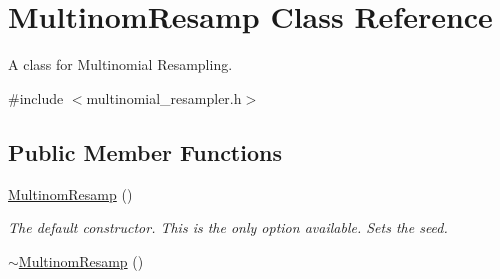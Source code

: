 \hypertarget{classMultinomResamp}{}\section{Multinom\+Resamp Class Reference}
\label{classMultinomResamp}


A class for Multinomial Resampling.  




{\ttfamily \#include $<$multinomial\+\_\+resampler.\+h$>$}

\subsection*{Public Member Functions}
\begin{DoxyCompactItemize}
\item 
\hyperlink{classMultinomResamp_a3134e22c0b7e0215045eb783bdc44669}{Multinom\+Resamp} ()\hypertarget{classMultinomResamp_a3134e22c0b7e0215045eb783bdc44669}{}\label{classMultinomResamp_a3134e22c0b7e0215045eb783bdc44669}

\begin{DoxyCompactList}\small\item\em The default constructor. This is the only option available. Sets the seed. \end{DoxyCompactList}\item 
\hyperlink{classMultinomResamp_a590495e677a522fa7863e3885631f777}{$\sim$\+Multinom\+Resamp} ()\hypertarget{classMultinomResamp_a590495e677a522fa7863e3885631f777}{}\label{classMultinomResamp_a590495e677a522fa7863e3885631f777}


\end{DoxyCompactItemize}
